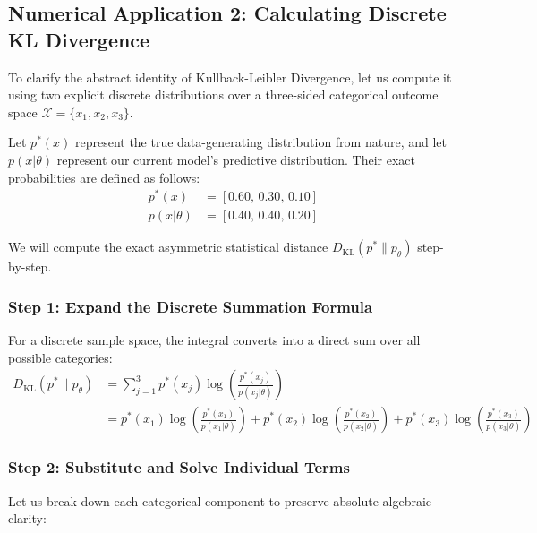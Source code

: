 \documentclass{article}
\begin{document}
\subsection{Numerical Application 2: Calculating Discrete KL Divergence}

To clarify the abstract identity of Kullback-Leibler Divergence, let us compute it using two explicit discrete distributions over a three-sided categorical outcome space $\mathcal{X} = \{x_1, x_2, x_3\}$.

Let $p^*(x)$ represent the true data-generating distribution from nature, and let $p(x|\theta)$ represent our current model's predictive distribution. Their exact probabilities are defined as follows:
\begin{align*}
p^*(x) &= [0.60, \, 0.30, \, 0.10] \\
p(x|\theta) &= [0.40, \, 0.40, \, 0.20]
\end{align*}

We will compute the exact asymmetric statistical distance $D_{\text{KL}}(p^* \parallel p_\theta)$ step-by-step.

\subsubsection{Step 1: Expand the Discrete Summation Formula}
For a discrete sample space, the integral converts into a direct sum over all possible categories:
\begin{align*}
D_{\text{KL}}(p^* \parallel p_\theta) &= \sum_{j=1}^{3} p^*(x_j) \log \left( \frac{p^*(x_j)}{p(x_j|\theta)} \right) \\
&= p^*(x_1)\log\left(\frac{p^*(x_1)}{p(x_1|\theta)}\right) + p^*(x_2)\log\left(\frac{p^*(x_2)}{p(x_2|\theta)}\right) + p^*(x_3)\log\left(\frac{p^*(x_3)}{p(x_3|\theta)}\right)
\end{align*}

\subsubsection{Step 2: Substitute and Solve Individual Terms}
Let us break down each categorical component to preserve absolute algebraic clarity:
\end{document}
